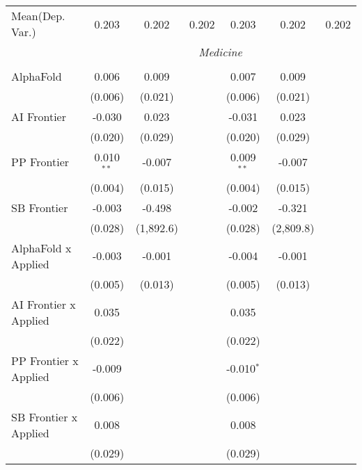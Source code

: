 \begin{tabular}{lcccccc}
Mean(Dep. Var.) & 0.203 & 0.202 & 0.202 & 0.203 & 0.202 & 0.202 \\
 & \multicolumn{6}{c}{\textit{Medicine}} \\ \\
   AlphaFold                    & 0.006        & 0.009     &                & 0.007        & 0.009     &   \\   
                                & (0.006)      & (0.021)   &                & (0.006)      & (0.021)   &   \\   
   AI Frontier                  & -0.030       & 0.023     &                & -0.031       & 0.023     &   \\   
                                & (0.020)      & (0.029)   &                & (0.020)      & (0.029)   &   \\   
   PP Frontier                  & 0.010$^{**}$ & -0.007    &                & 0.009$^{**}$ & -0.007    &   \\   
                                & (0.004)      & (0.015)   &                & (0.004)      & (0.015)   &   \\   
   SB Frontier                  & -0.003       & -0.498    &                & -0.002       & -0.321    &   \\   
                                & (0.028)      & (1,892.6) &                & (0.028)      & (2,809.8) &   \\   
   AlphaFold x Applied          & -0.003       & -0.001    &                & -0.004       & -0.001    &   \\   
                                & (0.005)      & (0.013)   &                & (0.005)      & (0.013)   &   \\   
   AI Frontier x Applied        & 0.035        &           &                & 0.035        &           &   \\   
                                & (0.022)      &           &                & (0.022)      &           &   \\   
   PP Frontier x Applied        & -0.009       &           &                & -0.010$^{*}$ &           &   \\   
                                & (0.006)      &           &                & (0.006)      &           &   \\   
   SB Frontier x Applied        & 0.008        &           &                & 0.008        &           &   \\   
                                & (0.029)      &           &                & (0.029)      &           &   \\   

\end{tabular}
